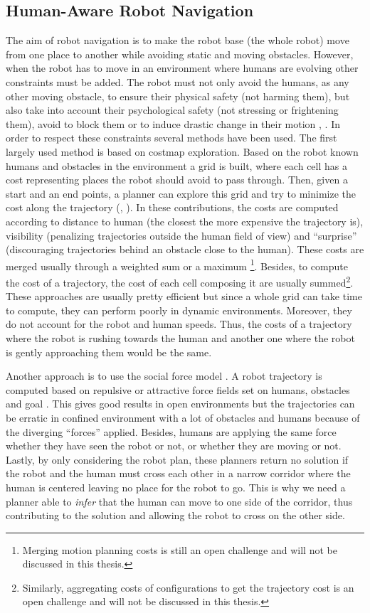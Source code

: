 \documentclass[a4paper,11pt,twoside]{StyleThese}
\begin{document}
\subsection{Human-Aware Robot Navigation}
The aim of robot navigation is to make the robot base (the whole robot) move from one place to another while avoiding static and moving obstacles. However, when the robot has to move in an environment where humans are evolving other constraints must be added. The robot must not only avoid the humans, as any other moving obstacle, to ensure their physical safety (not harming them), but also take into account their psychological safety (not stressing or frightening them), avoid to block them or to induce drastic change in their motion \cite{sisbot_human_2007}, \cite{kruse_human-aware_2013}. In order to respect these constraints several methods have been used. The first largely used method is based on costmap exploration. Based on the robot known humans and obstacles in the environment a grid is built, where each cell has a cost representing places the robot should avoid to pass through. Then, given a start and an end points, a planner can explore this grid and try to minimize the cost along the trajectory (\cite{sisbot_human_2007}, \cite{lu_towards_2013}). In these contributions, the costs are computed according to distance to human (the closest the more expensive the trajectory is), visibility (penalizing trajectories outside the human field of view) and ``surprise'' (discouraging trajectories behind an obstacle close to the human). These costs are merged usually through a weighted sum or a maximum \footnote{Merging motion planning costs is still an open challenge and will not be discussed in this thesis.}. Besides, to compute the cost of a trajectory, the cost of each cell composing it are usually summed\footnote{Similarly, aggregating costs of configurations to get the trajectory cost is an open challenge and will not be discussed in this thesis.}. These approaches are usually pretty efficient but since a whole grid can take time to compute, they can perform poorly in dynamic environments. Moreover, they do not account for the robot and human speeds. Thus, the costs of a trajectory where the robot is rushing towards the human and another one where the robot is gently approaching them would be the same.

Another approach is to use the social force model \cite{helbing_social_1995}. A robot trajectory is computed based on repulsive or attractive force fields set on humans, obstacles and goal \cite{ferrer_robot_2013}. This gives good results in open environments but the trajectories can be erratic in confined environment with a lot of obstacles and humans because of the diverging ``forces'' applied. Besides, humans are applying the same force whether they have seen the robot or not, or whether they are moving or not. Lastly, by only considering the robot plan, these planners return no solution if the robot and the human must cross each other in a narrow corridor where the human is centered leaving no place for the robot to go. This is why we need a planner able to \textit{infer} that the human can move to one side of the corridor, thus contributing to the solution and allowing the robot to cross on the other side.
\end{document}
